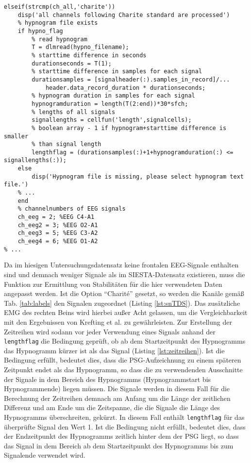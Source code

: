 \begin{lstlisting}[caption={Anpassung für den Charit\'{e}-Datensatz in der Funktion sn\_TDS.m}, label={lst:snTDS}]
% ...
elseif(strcmp(ch_all,'charite'))
    disp('all channels following Charite standard are processed')
    % hypnogram file exists
    if hypno_flag
        % read hypnogram
        T = dlmread(hypno_filename);
        % starttime difference in seconds
        durationseconds = T(1); 
        % starttime difference in samples for each signal
        durationsamples = [signalheader(:).samples_in_record]/...
            header.data_record_duration * durationseconds;
        % hypnogram duration in samples for each signal
        hypnogramduration = length(T(2:end))*30*sfch; 
        % lengths of all signals
        signallengths = cellfun('length',signalcells);
        % boolean array - 1 if hypnogram+starttime difference is smaller
        % than signal length 
        lengthflag = (durationsamples(:)+1+hypnogramduration(:) <= signallengths(:));
    else
        disp('Hypnogram file is missing, please select hypnogram text file.')
    % ...
    end
    % channelnumbers of EEG signals
    ch_eeg = 2; %EEG C4-A1
    ch_eeg2 = 3; %EEG O2-A1
    ch_eeg3 = 5; %EEG C3-A2
    ch_eeg4 = 6; %EEG O1-A2
% ...
\end{lstlisting}

Da im hiesigen Untersuchungsdatensatz keine frontalen EEG-Signale enthalten sind und demnach weniger Signale als im SIESTA-Datensatz existieren, muss die Funktion zur Ermittlung von Stabilitäten für die hier verwendeten Daten angepasst werden. Ist die Option "`Charit\'{e}"' gesetzt, so werden die Kanäle gemäß Tab. \ref{tab:labels} den Signalen zugeordnet (Listing \ref{lst:snTDS}). Das zusätzliche \acs{EMG} des rechten Beins wird hierbei außer Acht gelassen, um die Vergleichbarkeit mit den Ergebnissen von Krefting et al. zu gewährleisten. Zur Erstellung der Zeitreihen wird sodann vor jeder Verwendung eines Signals anhand der \texttt{lengthflag} die Bedingung geprüft, ob ab dem Startzeitpunkt des Hypnogramms das Hypnogramm kürzer ist als das Signal (Listing \ref{lst:zeitreihen}). Ist die Bedingung erfüllt, bedeutet dies, dass die \acs{PSG}-Aufzeichnung zu einem späteren Zeitpunkt endet als das Hypnogramm, so dass die zu verwendenden Ausschnitte der Signale in dem Bereich des Hypnogramms (Hypnogrammstart bis Hypnogrammende) liegen müssen. Die Signale werden in diesem Fall für die Berechnung der Zeitreihen demnach am Anfang um die Länge der zeitlichen Differenz und am Ende um die Zeitspanne, die die Signale die Länge des Hypnogramms überschreiten, gekürzt. In diesem Fall enthält \texttt{lengthflag} für das überprüfte Signal den Wert 1. Ist die Bedingung nicht erfüllt, bedeutet dies, dass der Endzeitpunkt des Hypnogramms zeitlich hinter dem der \acs{PSG} liegt, so dass das Signal in dem Bereich ab dem Startzeitpunkt des Hypnogramms bis zum Signalende verwendet wird.\\

